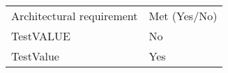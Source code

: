 \begin{tabular}{|l|l|}
	\hline
	Architectural requirement & Met (Yes/No)\\
	TestVALUE & No\\
	TestValue & Yes\\	 
	\hline
\end{tabular}